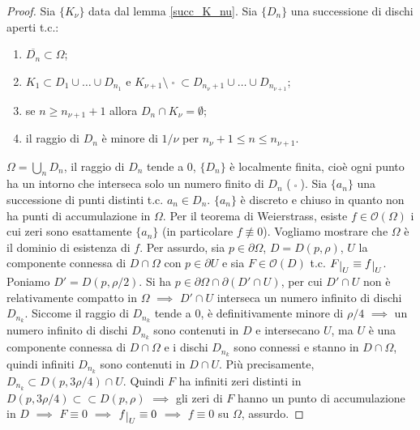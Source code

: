 \begin{proof}
  Sia $\{K_{\nu}\}$ data dal lemma \ref{succ_K_nu}. Sia $\{D_n\}$ una successione di dischi aperti t.c.:
  \begin{enumerate}
    \item $\overline{D_n} \subset \Omega$;
    \item $K_1 \subset D_1 \cup \dots \cup D_{n_1}$ e $K_{\nu+1}\setminus\mathop {K_{\nu}}\limits^ \circ \subset D_{n_{\nu}+1}\cup \dots \cup D_{n_{\nu+1}}$;
    \item se $n \ge n_{\nu+1}+1$ allora $D_n \cap K_{\nu}=\emptyset$;
    \item il raggio di $D_n$ è minore di $1/\nu$ per $n_{\nu}+1 \le n \le n_{\nu+1}$.
  \end{enumerate}
  $\displaystyle \Omega=\bigcup_n D_n$, il raggio di $D_n$ tende a $0$, $\{D_n\}$ è localmente finita, cioè ogni punto ha un intorno che interseca solo un numero finito di $D_n$ ($\mathop {K_{\nu}}\limits^ \circ$). Sia $\{a_n\}$ una successione di punti distinti t.c. $a_n \in D_n$. $\{a_n\}$ è discreto e chiuso in quanto non ha punti di accumulazione in $\Omega$.
  Per il teorema di Weierstrass, esiste $f \in \mathcal{O}(\Omega)$ i cui zeri sono esattamente $\{a_n\}$ (in particolare $f \not\equiv 0$). Vogliamo mostrare che $\Omega$ è il dominio di esistenza di $f$. Per assurdo, sia $p \in \partial\Omega$, $D=D(p,\rho)$, $U$ la componente connessa di $D \cap \Omega$ con $p \in \partial U$ e sia $F \in \mathcal{O}(D)$ t.c. $F\restrict{U}\equiv f\restrict{U}$.
  Poniamo $D'=D(p,\rho/2)$. Si ha $p \in \partial \Omega \cap \partial (D' \cap U)$, per cui $D' \cap U$ non è relativamente compatto in $\Omega$ $\implies$ $D'\cap U$ interseca un numero infinito di dischi $D_{n_k}$.
  Siccome il raggio di $D_{n_k}$ tende a $0$, è definitivamente minore di $\rho/4$ $\implies$ un numero infinito di dischi $D_{n_k}$ sono contenuti in $D$ e intersecano $U$, ma $U$ è una componente connessa di $D \cap \Omega$ e i dischi $D_{n_k}$ sono connessi e stanno in $D \cap \Omega$, quindi infiniti $D_{n_k}$ sono contenuti in $D \cap U$. Più precisamente, $D_{n_k} \subset D(p, 3\rho/4) \cap U$.
  Quindi $F$ ha infiniti zeri distinti in $D(p, 3\rho/4) \subset \subset D(p,\rho)$ $\implies$ gli zeri di $F$ hanno un punto di accumulazione in $D$ $\implies$ $F \equiv 0$ $\implies$ $f \restrict{U} \equiv 0$ $\implies$ $f \equiv 0$ su $\Omega$, assurdo.
\end{proof}
